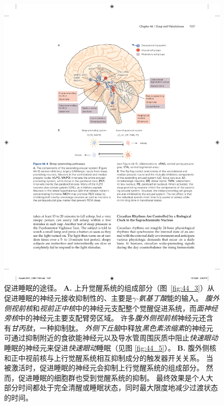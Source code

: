 \begin{figure}[htbp]
	\centering
	\includegraphics[width=0.95\linewidth]{chap44/fig_44_4}
	\caption{促进睡眠的途径。
		\textbf{A.} 上升觉醒系统的组成部分（图~\ref{fig:44_3}）从促进睡眠的神经元接收抑制性的、主要是\textit{$\gamma$-氨基丁酸}能的输入。
		\textit{腹外侧视前核}和\textit{视前正中核}中的神经元支配整个觉醒促进系统，而\textit{面神经旁核}中的神经元主要支配臂旁区域。
		许多\textit{腹外侧视前核}神经元还含有\textit{甘丙肽}，一种抑制肽。
		\textit{外侧下丘脑}中释放\textit{黑色素浓缩素}的神经元可通过抑制附近的食欲能神经元以及导水管周围灰质中阻止\textit{快速眼动}睡眠的神经元来促进\textit{快速眼动}睡眠（见图 \ref{fig:44_5}）。
		\textbf{B.} 腹外侧核和正中视前核与上行觉醒系统相互抑制成分的触发器开关关系。
		当被激活时，促进睡眠的神经元会抑制上行觉醒系统的组成部分。
		然而，促进睡眠的细胞群也受到觉醒系统的抑制。
		最终效果是个人大部分时间都处于完全清醒或睡眠状态，同时最大限度地减少过渡状态的时间。}
	\label{fig:44_4}
\end{figure}


